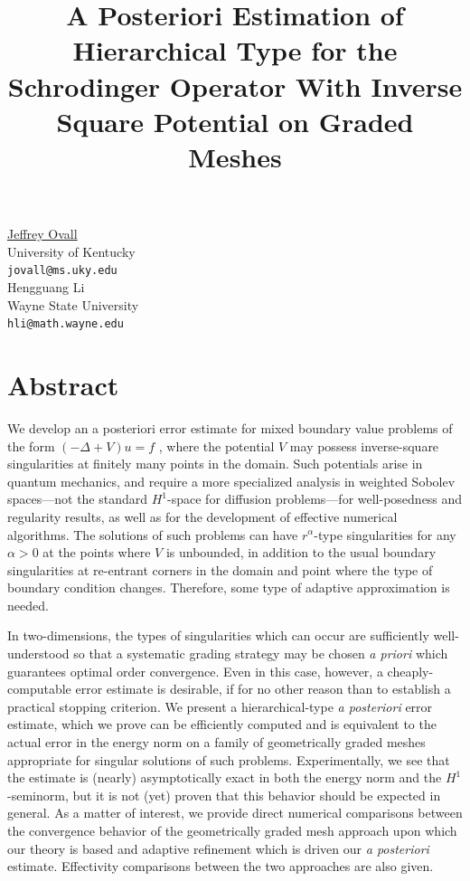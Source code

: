 \documentclass[article, A4, 11pt]{llncs}%
\begin{document}
\title{A Posteriori Estimation of Hierarchical Type for the  Schrodinger Operator With Inverse Square Potential on Graded Meshes}
 \author{} \institute{}
\maketitle
\begin{center}
{\large \underline{Jeffrey Ovall}}\\
University of Kentucky\\
{\tt jovall@ms.uky.edu}
\\ \vspace{4mm}
{\large Hengguang Li}\\
Wayne State University\\
{\tt hli@math.wayne.edu}
\end{center}

\section*{Abstract}
We develop an a posteriori error estimate for mixed boundary value problems of the form $(-\Delta + V )u = f$ , where the potential $V$ may possess inverse-square singularities at finitely many points in the domain. Such potentials arise in quantum mechanics, and require a more specialized analysis in weighted Sobolev spaces---not the standard $H^1$-space for diffusion problems---for well-posedness and regularity results, as well as for the development of effective numerical algorithms.  The solutions of such problems can have $r^{\alpha}$-type singularities for any $\alpha>0$ at the points where $V$ is unbounded, in addition to the usual boundary singularities at re-entrant corners in the domain and point where the type of boundary condition changes.  Therefore, some type of adaptive approximation is needed.  

In two-dimensions, the types of singularities which can occur are sufficiently well-understood so that a systematic grading strategy may be chosen \textit{a priori} which guarantees optimal order convergence.  Even in this case, however, a cheaply-computable error estimate is desirable, if for no other reason than to establish a practical stopping criterion.  We present a hierarchical-type \textit{a posteriori} error estimate, which we prove can be efficiently computed and is equivalent to the actual error in the energy norm on a family of geometrically graded meshes appropriate for singular solutions of such problems.  Experimentally, we see that the estimate is (nearly) asymptotically exact in both the energy norm and the $H^1$-seminorm, but it is not (yet) proven that this behavior should be expected in general.  As a matter of interest, we provide direct numerical comparisons between the convergence behavior of the geometrically graded mesh approach upon which our theory is based and adaptive refinement which is driven our \textit{a posteriori} estimate.  Effectivity comparisons between the two approaches are also given.
\end{document}
